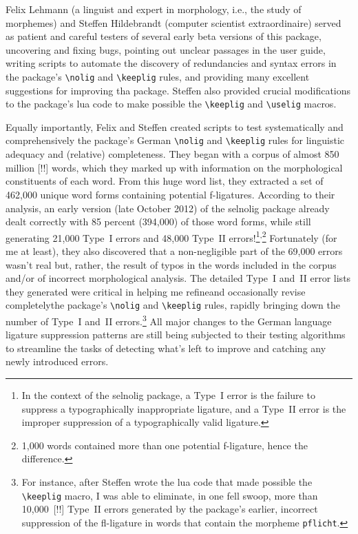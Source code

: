\documentclass[11pt]{article}
\newcommand{\pkg}[1]{\textsf{#1}}
\newcommand{\opt}[1]{\texttt{#1}}
\newcommand{\cmmd}[1]{\texttt{\textbackslash #1}}
\begin{document}
Felix Lehmann (a linguist and expert in morphology, i.e., the study of morphemes) and Steffen Hildebrandt (computer scientist extraordinaire) served as patient and careful testers of several early beta versions of this package, uncovering and fixing bugs, pointing out unclear passages in the user guide, writing scripts to automate the discovery of redundancies and syntax errors in the package's \cmmd{nolig} and \cmmd{keeplig} rules, and providing many excellent suggestions for improving tha package. Steffen also provided crucial modifications to the package's lua code to make possible the \cmmd{keeplig} and \cmmd{uselig} macros.

Equally importantly, Felix and Steffen created scripts to test systematically and comprehensively the package's German \cmmd{nolig} and \cmmd{keeplig} rules for linguistic adequacy and (relative) completeness.
They began with a corpus of almost 850 million [!!] words, which they marked up with information on the morphological constituents of each word. From this huge word list, they extracted a set of 462,000 unique word forms containing potential f-ligatures.
According to their analysis, an early version (late October 2012) of the \pkg{selnolig} package already dealt correctly with 85 percent (394,000) of those word forms, while still generating 21,000 Type~I errors and 48,000 Type~II errors!\footnote{In the context of the \pkg{selnolig} package, a Type~I error is the failure to suppress a typographically inappropriate ligature, and a Type~II error is the improper suppression of a typographically valid ligature.}\textsuperscript{,}\footnote{1,000 words contained more than one potential f-ligature, hence the difference.} 
Fortunately (for me at least), they also discovered that a non-negligible part of the 69,000 errors wasn't real but, rather, the result of typos in the words included in the corpus and/or of incorrect morphological analysis. The detailed Type~I and~II error lists they generated were critical in helping me refine\textemdash and occasionally revise completely\textemdash the package's \cmmd{nolig} and \cmmd{keeplig} rules, rapidly bringing down the number of Type~I and~II errors.\footnote{For instance, after Steffen wrote the lua code that made possible the \cmmd{keeplig} macro, I was able to eliminate, in one fell swoop, more than 10,000~[!!] Type~II errors generated by the package's earlier, incorrect suppression of the fl-ligature in words that contain the morpheme \opt{pflicht}. } All major changes to the German language ligature suppression patterns are still being subjected to their testing algorithms to streamline the tasks of detecting what's left to improve and catching any newly introduced errors.
\end{document}

